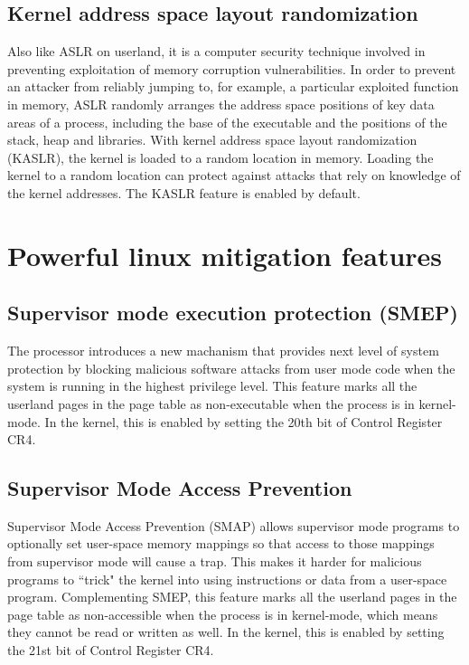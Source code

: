 \documentclass{masterthesis}
\begin{document}
\subsection{Kernel address space layout randomization}
\label{subsect:KASLR}
Also like ASLR on userland, it is a computer security technique involved in preventing exploitation of memory corruption vulnerabilities. In order to prevent an attacker from reliably jumping to, for example, a particular exploited function in memory, ASLR randomly arranges the address space positions of key data areas of a process, including the base of the executable and the positions of the stack, heap and libraries.
With kernel address space layout randomization (KASLR), the kernel is loaded to a random location in memory.
Loading the kernel to a random location can protect against attacks that rely on knowledge of the kernel addresses.
The KASLR feature is enabled by default.

\section{Powerful linux mitigation features}
\label{sect:powerful mitigation}

\subsection{Supervisor mode execution protection (SMEP)}
\label{subsect:SMEP}
The processor introduces a new machanism that provides next level of system protection by blocking malicious software attacks from user mode code when the system is running in the highest privilege level.
This feature marks all the userland pages in the page table as non-executable when the process is in kernel-mode. In the kernel, this is enabled by setting the 20th bit of Control Register CR4.

\subsection{Supervisor Mode Access Prevention}
\label{subsect:SMAP}
Supervisor Mode Access Prevention (SMAP) allows supervisor mode programs to optionally set user-space memory mappings so that access to those mappings from supervisor mode will cause a trap. This makes it harder for malicious programs to ``trick" the kernel into using instructions or data from a user-space program.
Complementing SMEP, this feature marks all the userland pages in the page table as non-accessible when the process is in kernel-mode, which means they cannot be read or written as well. In the kernel, this is enabled by setting the 21st bit of Control Register CR4.
\end{document}
